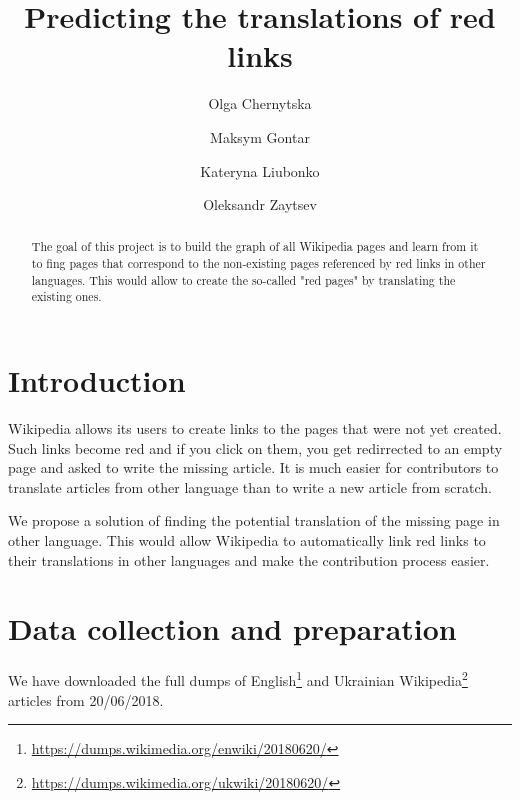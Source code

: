 \documentclass[11pt,a4paper]{article}
\begin{document}
\title{Predicting the translations of red links}
\date{}

\author[ ]{Olga Chernytska}
\author[ ]{Maksym Gontar}
\author[ ]{Kateryna Liubonko}
\author[ ]{Oleksandr Zaytsev}


\maketitle

\begin{abstract}
The goal of this project is to build the graph of all Wikipedia pages and learn from it to fing pages that correspond to the non-existing pages referenced by red links in other languages. This would allow to create the so-called "red pages" by translating the existing ones.
\end{abstract}

\section{Introduction}

Wikipedia allows its users to create links to the pages that were not yet created. Such links become red and if you click on them, you get redirrected to an empty page and asked to write the missing article. It is much easier for contributors to translate articles from other language than to write a new article from scratch.

We propose a solution of finding the potential translation of the missing page in other language. This would allow Wikipedia to automatically link red links to their translations in other languages and make the contribution process easier.

\section{Data collection and preparation}

We have downloaded the full dumps of English\footnote{\url{https://dumps.wikimedia.org/enwiki/20180620/}} and Ukrainian Wikipedia\footnote{\url{https://dumps.wikimedia.org/ukwiki/20180620/}} articles from 20/06/2018. 
\end{document}
